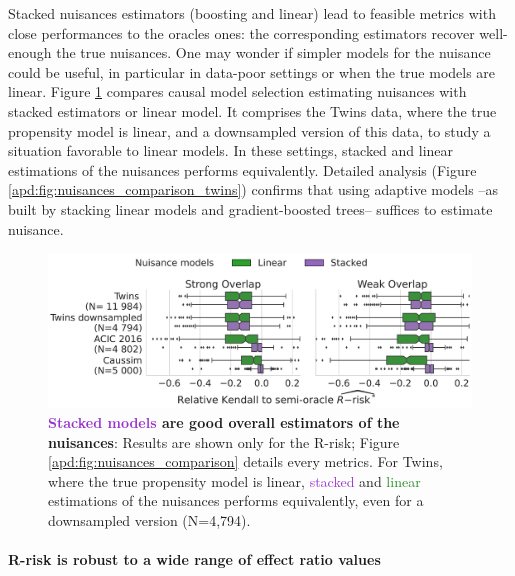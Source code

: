 \documentclass[a4paper,num-refs]{oup-contemporary}%
\begin{document}
Stacked nuisances estimators (boosting and linear) lead to feasible
metrics with close performances to the oracles ones: the
corresponding estimators recover well-enough the true nuisances.
One may wonder if simpler models for the nuisance could be useful,
in particular in data-poor settings or when the true models are linear.
Figure \ref{fig:all_datasets_nuisances_comparison} compares causal model
selection estimating nuisances with stacked estimators or linear model.
It comprises the Twins data, where the true propensity model is linear,
and a downsampled version of this data, to study a situation favorable to
linear models. In these settings,
stacked and linear estimations of the nuisances performs equivalently.
Detailed analysis (Figure \ref{apd:fig:nuisances_comparison_twins})
confirms that using adaptive models --as built by
stacking linear models and gradient-boosted trees-- suffices to estimate nuisance.

\begin{figure}[!tb]
    \centering\begin{minipage}{\linewidth}
        \includegraphics[width=\linewidth]{_4_nuisance_models_r_risk_3ds_2cols.pdf}
    \end{minipage}

    \caption{\textbf{\textcolor{DarkOrchid}{Stacked
                models} are good overall estimators of the nuisances}:
        Results are shown only for the
        R-risk; Figure \ref{apd:fig:nuisances_comparison}
        details every metrics. For Twins, where the true propensity
        model is linear, \textcolor{DarkOrchid}{stacked} and
        \textcolor{ForestGreen}{linear}
        estimations of the nuisances performs equivalently, even for a downsampled version
        (N=4,794). }\label{fig:all_datasets_nuisances_comparison}
\end{figure}


\paragraph{R-risk is robust to a wide range of effect ratio values}
\end{document}
